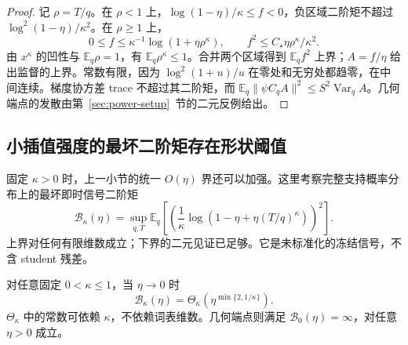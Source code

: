\documentclass[lang=cn,scheme=chinese,openany]{../book/elegantbook}
\newcommand{\E}{\mathbb E}
\newcommand{\Var}{\operatorname{Var}}
\begin{document}
\begin{proof}
记 $\rho=T/q$。在 $\rho<1$ 上，$\log(1-\eta)/\kappa\le f<0$，负区域二阶矩不超过 $\log^2(1-\eta)/\kappa^2$。在 $\rho\ge1$ 上，
\begin{equation}
 0\le f\le\kappa^{-1}\log(1+\eta\rho^\kappa),\qquad
 f^2\le C_\star\eta\rho^\kappa/\kappa^2.
\end{equation}
由 $x^\kappa$ 的凹性与 $\E_q\rho=1$，有 $\E_q\rho^\kappa\le1$。合并两个区域得到 $\E_qf^2$ 上界；$A=f/\eta$ 给出监督的上界。常数有限，因为 $\log^2(1+u)/u$ 在零处和无穷处都趋零，在中间连续。梯度协方差 trace 不超过其二阶矩，而 $\E_q\|\psi C_qA\|^2\le S^2\Var_qA$。几何端点的发散由第~\ref{sec:power-setup}~节的二元反例给出。
\end{proof}



\subsection{小插值强度的最坏二阶矩存在形状阈值}

固定 $\kappa>0$ 时，上一小节的统一 $O(\eta)$ 界还可以加强。这里考察完整支持概率分布上的最坏即时信号二阶矩
\begin{equation}
 \mathcal B_\kappa(\eta)
 =\sup_{q,T}\E_q\left[
 \left(\frac1\kappa\log(1-\eta+\eta(T/q)^\kappa)\right)^2
 \right].
\end{equation}
上界对任何有限维数成立；下界的二元见证已足够。它是未标准化的冻结信号，不含 student 残差。

\begin{theorem}[最坏二阶矩的精确小强度阶数]
\label{thm:proximal-moment-threshold}
对任意固定 $0<\kappa\le1$，当 $\eta\to0$ 时
\begin{equation}
 \mathcal B_\kappa(\eta)=\Theta_\kappa\left(\eta^{\min\{2,1/\kappa\}}\right).
 \label{eq:proximal-sharp-moment-order}
\end{equation}
$\Theta_\kappa$ 中的常数可依赖 $\kappa$，不依赖词表维数。几何端点则满足 $\mathcal B_0(\eta)=\infty$，对任意 $\eta>0$ 成立。
\end{theorem}
\end{document}

